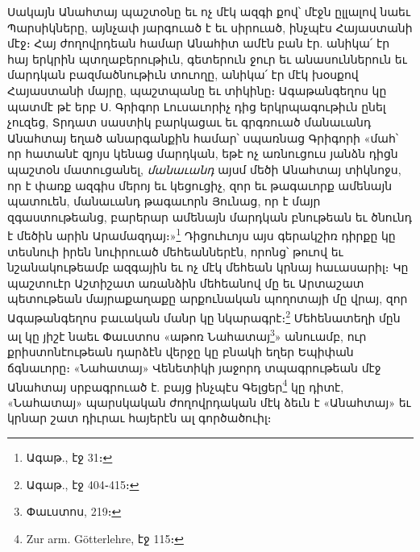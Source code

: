 \documentclass{article}
\begin{document}
{Սակայն Անահտայ պաշտօնը եւ ոչ մէկ ազգի քով՝ մէջն ըլլալով նաեւ Պարսիկները, այնչափ յարգուած է եւ սիրուած, ինչպէս Հայաստանի մէջ։ Հայ ժողովրդեան համար Անահիտ ամէն բան էր. անիկա՛ էր հայ երկրին պտղաբերութիւն, գետերուն ջուր եւ անասուններուն եւ մարդկան բազմածնութիւն տուողը, անիկա՛ էր մէկ խօսքով Հայաստանի մայրը, պաշտպանը եւ տիկինը։ Ագաթանգեղոս կը պատմէ թէ երբ Ս. Գրիգոր Լուսաւորիչ դից երկրպագութիւն ընել չուզեց, Տրդատ սաստիկ բարկացաւ եւ գրգռուած մանաւանդ Անահտայ եղած անարգանքին համար՝ սպառնաց Գրիգորի «մահ՝ որ հատանէ զյոյս կենաց մարդկան, եթէ ոչ առնուցուս յանձն դիցն պաշտօն մատուցանել, \emph{մանաւանդ} այսմ մեծի Անահտայ տիկնոջս, որ է փառք ազգիս մերոյ եւ կեցուցիչ, զոր եւ թագաւորք ամենայն պատուեն, մանաւանդ թագաւորն Յունաց, որ է մայր զգաստութեանց, բարերար ամենայն մարդկան բնութեան եւ ծնունդ է մեծին արին Արամազդայ։»\footnote{Ագաթ., էջ 31։} Դիցուհւոյս այս գերակշիռ դիրքը կը տեսնուի իրեն նուիրուած մեհեաններէն, որոնց՝ թուով եւ նշանակութեամբ ազգային եւ ոչ մէկ մեհեան կրնայ հաւասարիլ։ Կը պաշտուէր Աշտիշատ առանձին մեհեանով մը եւ Արտաշատ պետութեան մայրաքաղաքը արքունական պողոտայի մը վրայ, զոր Ագաթանգեղոս բաւական մանր կը նկարագրէ։\footnote{Ագաթ., էջ 404֊415։} Մեհենատեղի մըն ալ կը յիշէ նաեւ Փաւստոս «աթոռ Նահատայ\footnote{Փաւստոս, 219։}» անուամբ, ուր քրիստոնէութեան դարձէն վերջը կը բնակի եղեր Եպիփան ճգնաւորը։ «Նահատայ» Վենետիկի յաջորդ տպագրութեան մէջ Անահտայ սրբագրուած է. բայց ինչպէս Գելցեր\footnote{Zur arm. Götterlehre, էջ 115։} կը դիտէ, «Նահատայ» պարսկական ժողովրդական մէկ ձեւն է «Անահտայ» եւ կրնար շատ դիւրաւ հայերէն ալ գործածուիլ։

}
\end{document}
